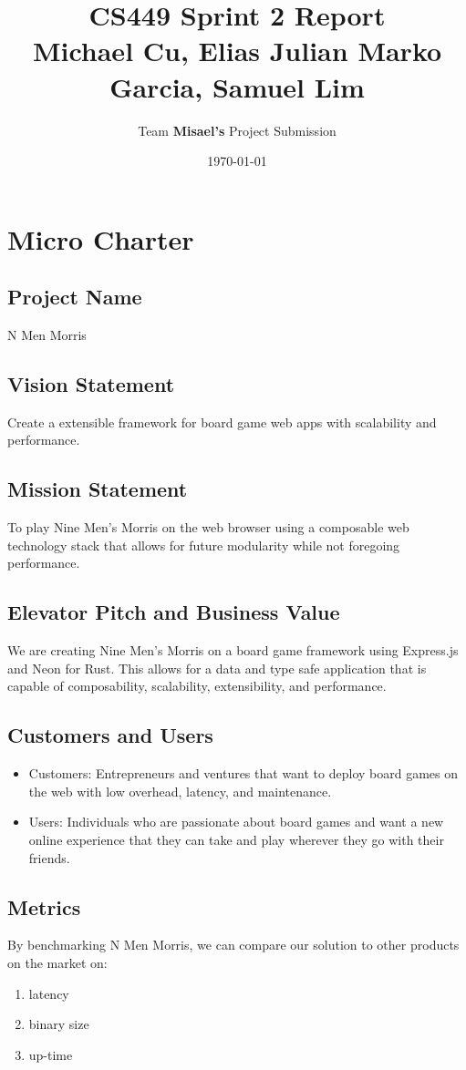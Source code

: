 \documentclass[11pt]{article}
\author{Team \textbf{Misael's} Project Submission}
\date{\today}
\title{CS449 Sprint 2 Report\\\medskip
\large Michael Cu, Elias Julian Marko Garcia, Samuel Lim}
\begin{document}
\maketitle
\tableofcontents


\section{Micro Charter}
\label{sec:orgd5d7a74}
\subsection{Project Name}
\label{sec:org9aacb67}
N Men Morris
\subsection{Vision Statement}
\label{sec:orga6fa6fc}
Create a extensible framework for board game web apps with scalability and performance.
\subsection{Mission Statement}
\label{sec:org420e3fc}
To play Nine Men's Morris on the web browser using a composable web technology stack that allows
for future modularity while not foregoing performance.
\subsection{Elevator Pitch and Business Value}
\label{sec:orgcfb234b}
We are creating Nine Men's Morris on a board game framework using Express.js and Neon for
Rust. This allows for a data and type safe application that is capable of composability,
scalability, extensibility, and performance.
\subsection{Customers and Users}
\label{sec:org4d5525e}
\begin{itemize}
\item Customers: Entrepreneurs and ventures that want to deploy board games on the web with low
overhead, latency, and maintenance.
\item Users: Individuals who are passionate about board games and want a new online experience that
they can take and play wherever they go with their friends.
\end{itemize}
\subsection{Metrics}
\label{sec:orga3004db}
By benchmarking N Men Morris, we can compare our solution to other products on the market on:
\begin{enumerate}
\item latency
\item binary size
\item up-time
\end{enumerate}
\end{document}
